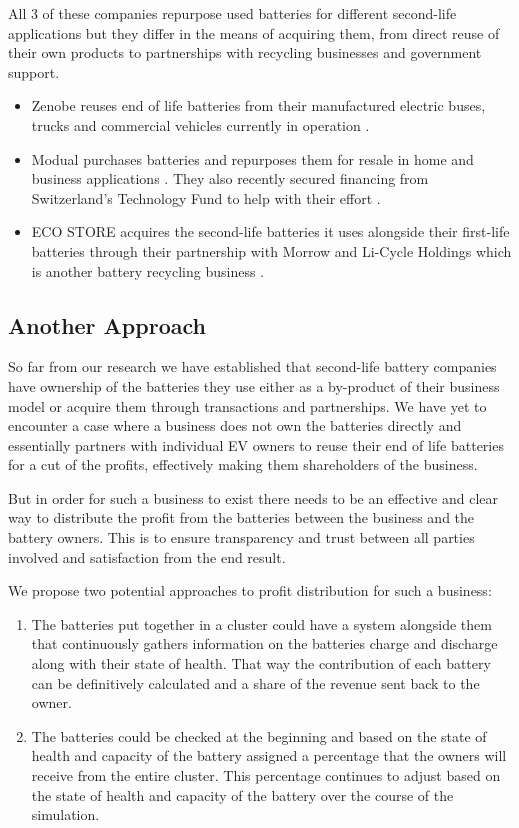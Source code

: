 \documentclass[conference]{IEEEtran}
\begin{document}
All 3 of these companies repurpose used batteries for different second-life applications but they differ in the means of acquiring them, from direct reuse of their own products to partnerships with recycling businesses and government support.

\begin{itemize}
  \item Zenobe reuses end of life batteries from their manufactured electric buses, trucks and commercial vehicles currently in operation \cite{b5}.
  \item Modual purchases batteries and repurposes them for resale in home and business applications \cite{b6}. They also recently secured financing from Switzerland’s Technology Fund to help with their effort \cite{b7}.
  \item ECO STORE acquires the second-life batteries it uses alongside their first-life batteries through their partnership with Morrow and Li-Cycle Holdings which is another battery recycling business \cite{b8, b9}.
\end{itemize}

\subsection{Another Approach}

So far from our research we have established that second-life battery companies have ownership of the batteries they use either as a by-product of their business model or acquire them through transactions and partnerships. We have yet to encounter a case where a business does not own the batteries directly and essentially partners with individual EV owners to reuse their end of life batteries for a cut of the profits, effectively making them shareholders of the business.

But in order for such a business to exist there needs to be an effective and clear way to distribute the profit from the batteries between the business and the battery owners. This is to ensure transparency and trust between all parties involved and satisfaction from the end result.

We propose two potential approaches to profit distribution for such a business:

\begin{enumerate}
    \item The batteries put together in a cluster could have a system alongside them that continuously gathers information on the batteries charge and discharge along with their state of health. That way the contribution of each battery can be definitively calculated and a share of the revenue sent back to the owner.
    \item The batteries could be checked at the beginning and based on the state of health and capacity of the battery assigned a percentage that the owners will receive from the entire cluster. This percentage continues to adjust based on the state of health and capacity of the battery over the course of the simulation.
\end{enumerate}
\end{document}
